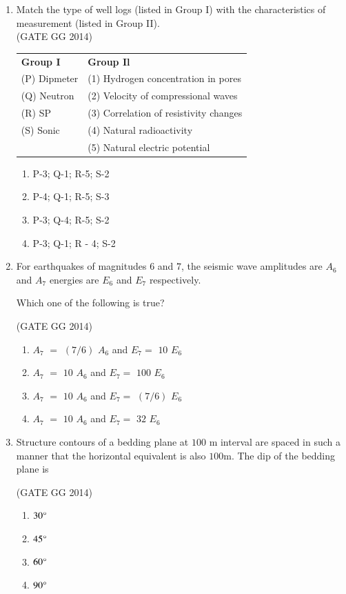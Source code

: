 \documentclass[journal]{IEEEtran}
\begin{document}
\begin{enumerate}[start=1]
\item  Match the type of well logs (listed in Group I) with the characteristics of measurement (listed in Group II).\\

\hfill{(GATE GG 2014)}\\
\begin{tabular}{ l l }
\textbf{Group I} & \textbf{Group Il}\\
(P) Dipmeter & (1) Hydrogen concentration in pores\\
(Q) Neutron & (2) Velocity of compressional waves\\
(R) SP & (3) Correlation of resistivity changes\\
(S) Sonic & (4) Natural radioactivity\\
 & (5) Natural electric potential
 \end{tabular}
 \begin{multicols}{2}
     \begin{enumerate}
    \item  P-3; Q-1; R-5; S-2
    \item  P-4; Q-1; R-5; S-3
    \item  P-3; Q-4; R-5; S-2
\item  P-3; Q-1; R - 4; S-2
\end{enumerate}
 \end{multicols}


\item For earthquakes of magnitudes $6$ and $7$, the seismic wave amplitudes are $A_6$ and $A_7$ energies are $E_6$ and $E_7$ respectively.

Which one of the following is true?

\hfill{(GATE GG 2014)}\\
\begin{enumerate}
    \item  $A_7$ $=$ $(7/6)$ $A_6$ and $E_7$$=$ $10$ $E_6$
\item  $A_7$ $=$ $10$ $A_6$ and $E_7$$=$ $100$ $E_6$
\item  $A_7$ $=$ $10$ $A_6$ and $E_7$$=$ $(7/6)$ $E_6$
\item  $A_7$ $=$ $10$ $A_6$ and $E_7$$=$ $32$ $E_6$
\end{enumerate}

\item  Structure contours of a bedding plane at $100$ m interval are spaced in such a manner that the horizontal equivalent is also $100$m. The dip of the bedding plane is

\hfill{(GATE GG 2014)}\\
\begin{multicols}{4}
    \begin{enumerate}
    \item $30\degree$
     \item $45\degree$
     \item $60\degree$
      \item $90\degree$
\end{enumerate}
\end{multicols}



\end{enumerate}
\end{document}
